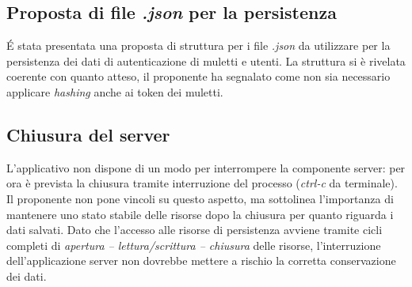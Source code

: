 \subsection{Proposta di file \textit{.json} per la persistenza}

\'E stata presentata una proposta di struttura per i file \textit{.json} da utilizzare per la persistenza dei dati di autenticazione di muletti e utenti. La struttura si è rivelata coerente con quanto atteso, il proponente ha segnalato come non sia necessario applicare \textit{hashing} anche ai token dei muletti.

\subsection{Chiusura del server}

L'applicativo non dispone di un modo per interrompere la componente server: per ora è prevista la chiusura tramite interruzione del processo (\textit{ctrl-c} da terminale). Il proponente non pone vincoli su questo aspetto, ma sottolinea l'importanza di mantenere uno stato stabile delle risorse dopo la chiusura per quanto riguarda i dati salvati.
Dato che l'accesso alle risorse di persistenza avviene tramite cicli completi di \textit{apertura -- lettura/scrittura -- chiusura} delle risorse, l'interruzione dell'applicazione server non dovrebbe mettere a rischio la corretta conservazione dei dati.


